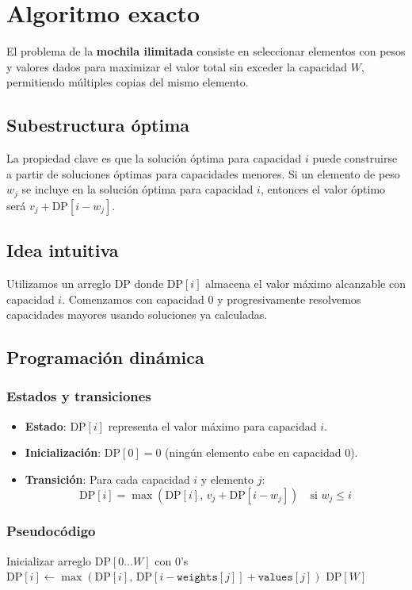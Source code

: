 \documentclass{report}
\begin{document}
\section{Algoritmo exacto}
El problema de la \textbf{mochila ilimitada} consiste en seleccionar elementos con pesos y valores dados para maximizar el valor total sin exceder la capacidad $W$, permitiendo múltiples copias del mismo elemento. 

\subsection*{Subestructura óptima}
La propiedad clave es que la solución óptima para capacidad $i$ puede construirse a partir de soluciones óptimas para capacidades menores. Si un elemento de peso $w_j$ se incluye en la solución óptima para capacidad $i$, entonces el valor óptimo será $v_j + \text{DP}[i - w_j]$.

\subsection*{Idea intuitiva}
Utilizamos un arreglo $\text{DP}$ donde $\text{DP}[i]$ almacena el valor máximo alcanzable con capacidad $i$. Comenzamos con capacidad 0 y progresivamente resolvemos capacidades mayores usando soluciones ya calculadas.

\subsection{Programación dinámica}
\subsubsection*{Estados y transiciones}
\begin{itemize}
    \item \textbf{Estado}: $\text{DP}[i]$ representa el valor máximo para capacidad $i$.
    \item \textbf{Inicialización}: $\text{DP}[0] = 0$ (ningún elemento cabe en capacidad 0).
    \item \textbf{Transición}: Para cada capacidad $i$ y elemento $j$:
        \[
        \text{DP}[i] = \max\left(\text{DP}[i],\, v_j + \text{DP}[i - w_j]\right) \quad \text{si } w_j \leq i
        \]
\end{itemize}

\subsubsection*{Pseudocódigo}
\begin{algorithmic}[1]
    \State Inicializar arreglo $\text{DP}[0 \dots W]$ con 0's
                \State $\text{DP}[i] \gets \max(\text{DP}[i],\, \text{DP}[i - \texttt{weights}[j]] + \texttt{values}[j])$
            \EndIf
        \EndFor
    \EndFor
    \State \Return $\text{DP}[W]$
\EndProcedure
\end{algorithmic}
\end{document}
